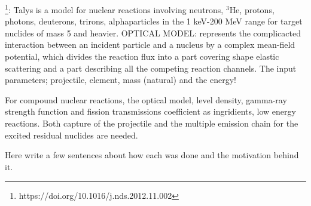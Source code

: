 \footnote{https://doi.org/10.1016/j.nds.2012.11.002}: Talys is a model for nuclear reactions involving neutrons, $^3$He, protons, photons, deuterons, trirons, alphaparticles in the 1 keV-200 MeV range for target nuclides of mass 5 and heavier. 
OPTICAL MODEL: represents the complicacted interaction between an incident particle and a nucleus by a complex mean-field potential, which divides the reaction flux into a part covering shape elastic scattering and a part describing all the competing reaction channels. The input parameters; projectile, element, mass (natural) and the energy! 

For compound nuclear reactions, the optical model, level density, gamma-ray strength function and fission transmissions coefficient as ingridients, low energy reactions. Both capture of the projectile and the multiple emission chain for the excited residual nuclides are needed. 










Here write a few sentences about how each was done and the motivation behind it. 





